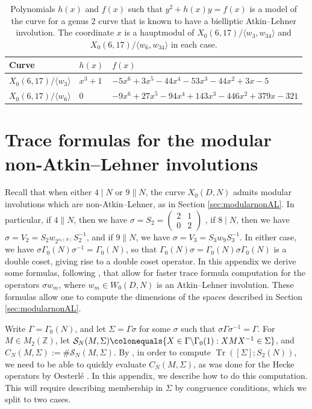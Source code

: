 \documentclass[12pt]{amsart}
\newcommand{\Z}{\mathbb{Z}}
\newcommand{\calS}{\mathcal{S}}
\DeclareMathOperator{\Tr}{Tr}
\numberwithin{equation}{subsection}
\theoremstyle{plain}\newtheorem{ithm}{Theorem}
\theoremstyle{plain}\newtheorem{iprop}[ithm]{Proposition}
\theoremstyle{definition}
\theoremstyle{remark}
\newcommand{\Curve}[2]{X_0({#1},{#2})} %
\newcommand{\ALfull}[2]{W_0({#1},{#2})} %
\newcommand{\mattwo}[4]{\left( \begin{array}{cc} {#1} & {#2} \\ {#3} & {#4} \end{array} \right)}
\begin{document}
\begin{table}[ht]
\centering
\small
\renewcommand{\arraystretch}{1.1}
\begin{tabular}{lll}
\hline
\textbf{Curve} & $h(x)$  & $f(x)$   \\
\hline
$X_0(6,	17)/\langle w_3 \rangle$	&$ x^3 +1$& $ -5x^6+3x^5-44x^4-53x^3-44x^2+3x-5$\\

$X_0(6,	17)/\langle w_6 \rangle$	&0 & $-9x^6 + 27x^5 - 94x^4 + 143x^3 - 446x^2 + 379x - 321$\\
\hline
\end{tabular}
\caption{Polynomials $h(x)$ and $f(x)$ such that $y^2 +h(x)y =f(x)$ is a model of the curve for a genus 2 curve that is known to have a bielliptic Atkin--Lehner involution. The coordinate $x$ is a hauptmodul of  $\Curve{6}{17}/\langle w_3, w_{34} \rangle$ and $\Curve{6}{17}/\langle w_6, w_{34} \rangle$ in each case.}
\label{modelsbielliptic}
\end{table}

\newpage



\appendix
{}

\section{Trace formulas for the modular non-Atkin--Lehner involutions}
\label{appendix}

Recall that when either $4 \mid N$ or $9 \parallel N$, the curve $\Curve{D}{N}$ admits modular involutions which are non-Atkin--Lehner, as in Section \ref{sec:modularnonAL}. In particular, if $4 \parallel N$, then we have $\sigma = S_2 = \mattwo{2}{1}{0}{2}$ , if $8 \mid N$, then we have $\sigma = V_2 = S_2 w_{2^{v_2(N)}} S_2^{-1}$, and if $9 \parallel N$, we have $\sigma = V_3 = S_3 w_9 S_3^{-1}$. In either case, we have $\sigma \Gamma_0(N) \sigma^{-1} = \Gamma_0(N)$, so that $\Gamma_0(N) \sigma = \Gamma_0(N) \sigma \Gamma_0(N)$ is a double coset, giving rise to a double coset operator. In this appendix we derive some formulas, following \cite{PopaII}, that allow for faster trace formula computation for the operators $\sigma w_m$, where $w_m \in \ALfull{D}{N}$ is an Atkin--Lehner involution. 
These formulas allow one to compute the dimensions of the spaces described in Section \ref{sec:modularnonAL}.

Write $\Gamma = \Gamma_0(N)$, and let $\Sigma = \Gamma \sigma$ for some $\sigma$ such that $\sigma \Gamma \sigma^{-1} = \Gamma$.
For $M \in M_2(\Z)$, let $\calS_N(M, \Sigma) \colonequals \{ X \in \Gamma \backslash \Gamma_0(1) : XMX^{-1} \in \Sigma \}$, and $C_N(M, \Sigma) := \# \calS_N(M, \Sigma)$. 
By \cite[Theorem 1 and \S 2.3]{PopaII}, in order to compute $\Tr([\Sigma]; S_2(N))$, we need to be able to quickly evaluate $C_N(M, \Sigma)$, as was done for the Hecke operators by Oesterl{\'e} \cite[Lemma 4.1]{PopaII}. In this appendix, we describe how to do this computation.
This will require describing membership in $\Sigma$ by congruence conditions, which we split to two cases.
\end{document}
